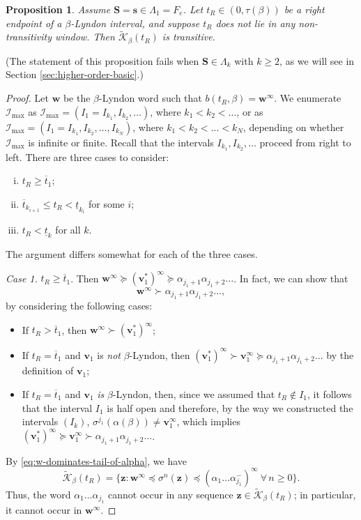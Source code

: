\documentclass[11pt]{amsart}
\newtheorem{proposition}[theorem]{Proposition}
\theoremstyle{definition}
\theoremstyle{remark}
\numberwithin{equation}{section}
\renewcommand{\L}{\ensuremath{\mathbb{L}}}
\newcommand{\II}{\mathcal{I}}
\newcommand{\Kt}{\widetilde{\mathcal{K}}}
\newcommand{\s}{ {\mathbf{s}}}
\newcommand{\cs}{ {\mathbf{S}}}
\renewcommand{\v}{\mathbf{v}}
\newcommand{\w}{\mathbf{w}}
\newcommand{\z}{\mathbf{z}}
\newcommand{\f}{\infty}
\newcommand{\al}{\alpha}
\newcommand{\lle}{\preccurlyeq}
\newcommand{\lge}{\succcurlyeq}
\newcommand{\si}{\sigma}
\newcommand{\La}{\Lambda}
\begin{document}
\begin{proposition} \label{prop:transitive-in-between}
Assume $\cs=\s\in\La_1={F_e}$. Let $t_R\in(0,\tau(\beta))$ be a right endpoint of a $\beta$-Lyndon interval, and suppose $t_R$ does not lie in any non-transitivity window. Then $\Kt_\beta(t_R)$ is transitive.
\end{proposition}

(The statement of this proposition fails when $\cs\in\La_k$ with $k\geq 2$, as we will see in Section \ref{sec:higher-order-basic}.)

\begin{proof}
Let $\w$ be the $\beta$-Lyndon word such that $b(t_R,\beta)=\w^\f$.
We enumerate $\II_{\max}$ as $\II_{\max}=(I_1=I_{k_1},I_{k_2},\dots)$, where $k_1<k_2<\dots$, or as $\II_{\max}=(I_1=I_{k_1},I_{k_2},\dots,I_{k_N})$, where $k_1<k_2<\dots<k_N$, depending on whether $\II_{\max}$ is infinite or finite. Recall that the intervals $I_{k_1},I_{k_2},\dots$ proceed from right to left. There are three cases to consider:
\begin{enumerate}[(i)]
\item $t_R\geq \overline{t}_1$;
\item $\overline{t}_{k_{i+1}}\leq t_R<\underline{t}_{k_i}$ for some $i$;
\item $t_R<\underline{t}_k$ for all $k$.
\end{enumerate}
The argument differs somewhat for each of the three cases.

\medskip
{\em Case 1.} $t_R\geq \overline{t}_1$. Then $\w^\f\lge (\v_1^*)^\f\lge \al_{j_1+1}\al_{j_1+2}\dots$.
In fact, we can show that
\begin{equation} \label{eq:w-dominates-tail-of-alpha}
\w^\f\succ \al_{j_1+1}\al_{j_1+2}\dots,
\end{equation}
by considering the following cases:
\begin{itemize}
\item If $t_R>\overline{t}_1$, then $\w^\f\succ (\v_1^*)^\f$;
\item If $t_R=\overline{t}_1$ and $\v_1$ is {\em not} $\beta$-Lyndon, then $(\v_1^*)^\f\succ \v_1^\f\lge \al_{j_1+1}\al_{j_1+2}\dots$ by the definition of $\v_1$;
\item If $t_R=\overline{t}_1$ and $\v_1$ {\em is} $\beta$-Lyndon, then, since we assumed that $t_R\not\in I_1$, {it follows that the interval $I_1$ is half open and therefore, by the way we constructed the intervals $(I_k)$}, $\si^{j_1}(\al(\beta))\neq \v_1^\f$, which implies $(\v_1^*)^\f\lge\v_1^\f\succ \al_{j_1+1}\al_{j_1+2}\dots$.
\end{itemize}
By \eqref{eq:w-dominates-tail-of-alpha}, we have
\[
\Kt_\beta(t_R)=\{\z: \w^\f\lle \si^n(\z)\lle (\al_1\dots\al_{j_1}^-)^\f\ \forall\,n\geq 0\}.
\]
Thus, the word $\al_1\dots\al_{j_1}$ cannot occur in any sequence $\z\in\Kt_\beta(t_R)$; in particular, it cannot occur in $\w^\f$.


\end{proof}
\end{document}
